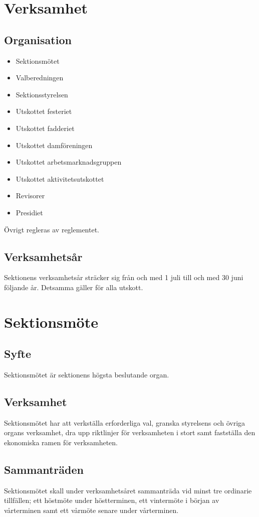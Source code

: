 \documentclass{datateknologsektionen-document}
\begin{document}
\section{Verksamhet}
\subsection{Organisation}
\begin{itemize}
  \item Sektionsmötet
  \item Valberedningen
  \item Sektionsstyrelsen
  \item Utskottet festeriet
  \item Utskottet fadderiet
  \item Utskottet damföreningen
  \item Utskottet arbetsmarknadsgruppen
  \item Utskottet aktivitetsutskottet
  \item Revisorer
  \item Presidiet
\end{itemize}
Övrigt regleras av reglementet.

\subsection{Verksamhetsår}
Sektionens verksamhetsår sträcker sig från och med 1 juli till och med 30 juni följande
år. Detsamma gäller för alla utskott.
\section{Sektionsmöte}
\subsection{Syfte}
Sektionsmötet är sektionens högsta beslutande organ.
\subsection{Verksamhet}
Sektionsmötet har att verkställa erforderliga val, granska styrelsens och övriga organs
verksamhet, dra upp riktlinjer för verksamheten i stort samt fastställa den ekonomiska
ramen för verksamheten.
\subsection{Sammanträden}
Sektionsmötet skall under verksamhetsåret sammanträda vid minst tre ordinarie tillfällen;
ett höstmöte under höstterminen, ett vintermöte i början av vårterminen samt ett vårmöte
senare under vårterminen.
\end{document}
